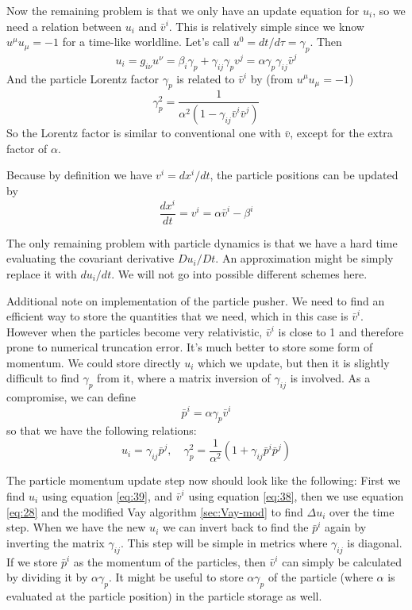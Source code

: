 Now the remaining problem is that we only have an update equation for $u_i$, so
we need a relation between $u_i$ and $\bar{v}^{i}$. This is relatively simple
since we know $u^{\mu}u_{\mu} = -1$ for a time-like worldline. Let's call $u^0 =
dt/d\tau = \gamma_p$. Then
\begin{equation}
  \label{eq:29}
  u_i = g_{i\nu}u^{\nu} = \beta_i\gamma_p + \gamma_{ij}\gamma_pv^j = \alpha \gamma_p \gamma_{ij}\bar{v}^j
\end{equation}
And the particle Lorentz factor $\gamma_p$ is related to $\bar{v}^i$ by (from
$u^{\mu}u_{\mu} = -1$)
\begin{equation}
  \label{eq:30}
  \gamma_{p}^2 = \frac{1}{\alpha^2(1 - \gamma_{ij}\bar{v}^i\bar{v}^j)}
\end{equation}
So the Lorentz factor is similar to conventional one with $\bar{v}$, except for
the extra factor of $\alpha$.

Because by definition we have $v^i = dx^i/dt$, the particle positions can be
updated by
\begin{equation}
  \label{eq:31}
  \frac{dx^i}{dt} = v^i = \alpha \bar{v}^i - \beta^{i}
\end{equation}

The only remaining problem with particle dynamics is that we have a hard time
evaluating the covariant derivative $Du_i/Dt$. An approximation might be simply
replace it with $du_i/dt$. We will not go into possible different schemes here.

Additional note on implementation of the particle pusher. We need to find an
efficient way to store the quantities that we need, which in this case is
$\bar{v}^i$. However when the particles become very relativistic, $\bar{v}^i$ is
close to 1 and therefore prone to numerical truncation error. It's much better
to store some form of momentum. We could store directly $u_i$ which we update,
but then it is slightly difficult to find $\gamma_p$ from it, where a matrix
inversion of $\gamma_{ij}$ is involved. As a compromise, we can define
\begin{equation}
  \label{eq:38}
  \bar{p}^i = \alpha\gamma_p\bar{v}^i
\end{equation}
so that we have the following relations:
\begin{equation}
  \label{eq:39}
  u_i = \gamma_{ij}\bar{p}^j,\quad \gamma_p^2 = \frac{1}{\alpha^2}(1 + \gamma_{ij}\bar{p}^i\bar{p}^j)
\end{equation}

The particle momentum update step now should look like the following: First we
find $u_i$ using equation \eqref{eq:39}, and $\bar{v}^i$ using equation
\eqref{eq:38}, then we use equation \eqref{eq:28} and the modified Vay algorithm
\ref{sec:Vay-mod} to find $\Delta u_i$ over the time step. When we have the new
$u_i$ we can invert back to find the $\bar{p}^i$ again by inverting the matrix
$\gamma_{ij}$. This step will be simple in metrics where $\gamma_{ij}$ is
diagonal. If we store $\bar{p}^i$ as the momentum of the particles, then
$\bar{v}^i$ can simply be calculated by dividing it by $\alpha\gamma_p$. It
might be useful to store $\alpha\gamma_p$ of the particle (where $\alpha$ is
evaluated at the particle position) in the particle storage as well.

